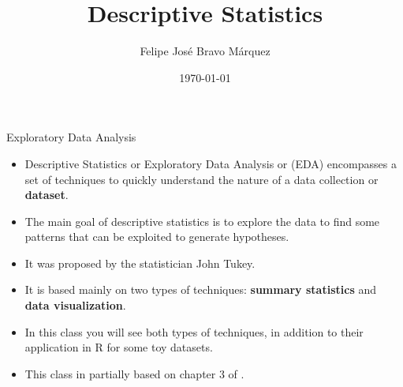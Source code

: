\documentclass[handout]{beamer}
\title{Descriptive Statistics}
\author[Felipe Bravo Márquez]{\footnotesize
 \textcolor[rgb]{0.00,0.00,1.00}{Felipe José Bravo Márquez}}
\date{ \today }
\begin{document}
\begin{frame}
\titlepage


\end{frame}








\begin{frame}{Exploratory Data Analysis}
\scriptsize{
\begin{itemize}
 \item Descriptive Statistics or Exploratory Data Analysis or (EDA) encompasses a set of techniques to quickly understand the nature of a data collection or \textbf{dataset}.
 
 \item The main goal of descriptive statistics is to explore the data to find some patterns that can be exploited to generate hypotheses.
 
 \item It was proposed by the statistician John Tukey.
 
 \item It is based mainly on two types of techniques: \textbf{summary statistics} and \textbf{data visualization}.
 
 \item In this class you will see both types of techniques, in addition to their application in R for some toy datasets.
 
 \item This class in partially based on chapter 3 of \cite{tan2016introduction}.  
 
\end{itemize}

}

\end{frame}
\end{document}
